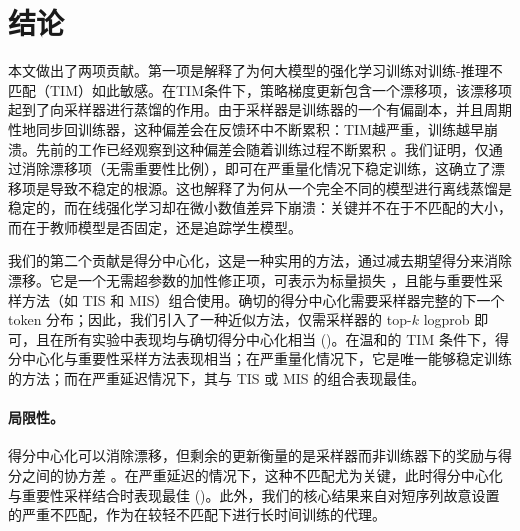 \section{结论}

本文做出了两项贡献。第一项是解释了为何大模型的强化学习训练对训练-推理不匹配（TIM）如此敏感。在TIM条件下，策略梯度更新包含一个漂移项，该漂移项起到了向采样器进行蒸馏的作用。由于采样器是训练器的一个有偏副本，并且周期性地同步回训练器，这种偏差会在反馈环中不断累积：TIM越严重，训练越早崩溃。先前的工作已经观察到这种偏差会随着训练过程不断累积 \citep{probing, mai_1}。我们证明，仅通过消除漂移项（无需重要性比例），即可在严重量化情况下稳定训练，这确立了漂移项是导致不稳定的根源。这也解释了为何从一个完全不同的模型进行离线蒸馏是稳定的，而在线强化学习却在微小数值差异下崩溃：关键并不在于不匹配的大小，而在于教师模型是否固定，还是追踪学生模型。

我们的第二个贡献是得分中心化，这是一种实用的方法，通过减去期望得分来消除漂移。它是一个无需超参数的加性修正项，可表示为标量损失 ，且能与重要性采样方法（如 TIS 和 MIS）组合使用。确切的得分中心化需要采样器完整的下一个 token 分布；因此，我们引入了一种近似方法，仅需采样器的 top-$k$  logprob 即可，且在所有实验中表现均与确切得分中心化相当 ()。在温和的 TIM 条件下，得分中心化与重要性采样方法表现相当；在严重量化情况下，它是唯一能够稳定训练的方法；而在严重延迟情况下，其与 TIS 或 MIS 的组合表现最佳。

\paragraph{局限性。} 得分中心化可以消除漂移，但剩余的更新衡量的是采样器而非训练器下的奖励与得分之间的协方差 。在严重延迟的情况下，这种不匹配尤为关键，此时得分中心化与重要性采样结合时表现最佳 ()。此外，我们的核心结果来自对短序列故意设置的严重不匹配，作为在较轻不匹配下进行长时间训练的代理。